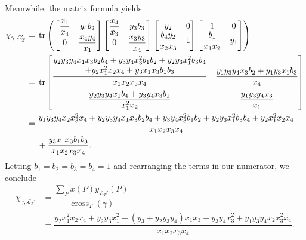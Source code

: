 \documentclass[10pt,a4paper]{amsart}
\numberwithin{equation}{section}
\theoremstyle{definition}
\begin{document}
Meanwhile, the matrix formula yields
\begin{align*}
\chi_{\gamma, \mathcal{L}_T'}={}&\operatorname{tr}\left(
\begin{bmatrix}
 \dfrac{x_1}{x_4} & y_4b_2\\
 0 & \dfrac{x_4y_4}{x_1}
\end{bmatrix}
\begin{bmatrix}
 \dfrac{x_4}{x_3} & y_3b_3\\
 0 & \dfrac{x_3y_3}{x_4}
\end{bmatrix}
\begin{bmatrix}
 y_2 & 0\\
 \dfrac{b_4y_2}{x_2x_3} & 1
\end{bmatrix}
\begin{bmatrix}
 1 & 0\\
 \dfrac{b_1}{x_1x_2} & y_1
\end{bmatrix}\right)\\
={}&\operatorname{tr}
\begin{bmatrix}
 \dfrac{\begin{array}{@{}c@{}}y_2y_3y_4x_1x_3b_2b_4+y_3y_4x_3^2b_1b_2+y_2y_3x_1^2b_3b_4\\
 +y_2x_1^2x_2x_4+y_3x_1x_3b_1b_3\end{array}}{x_1x_2x_3x_4} & \dfrac{y_1y_3y_4x_3b_2+y_1y_3x_1b_3}{x_4}\vspace{2mm}\\
 \dfrac{y_2y_3y_4x_1b_4+y_3y_4x_3b_1}{x_1^2x_2} & \dfrac{y_1y_3y_4x_3}{x_1}
\end{bmatrix}\\
={}&\dfrac{y_1y_3y_4x_2x_3^2x_4+y_2y_3y_4x_1x_3b_2b_4+y_3y_4x_3^2b_1b_2+y_2y_3x_1^2b_3b_4+y_2x_1^2x_2x_4}{x_1x_2x_3x_4}\\
&+\dfrac{y_3x_1x_3b_1b_3}{x_1x_2x_3x_4}.
\end{align*}
Letting $b_1=b_2=b_3=b_4=1$ and rearranging the terms in our numerator, we conclude
\begin{align*}
\chi_{\gamma, \mathcal{L}_T'}&=\dfrac{\sum_P x(P)y_{\mathcal{L}_T'}(P)}{\operatorname{cross}_T(\gamma)}\\
&=\dfrac{y_2x_1^2x_2x_4+y_2y_3x_1^2+(y_3+y_2y_3y_4)x_1x_3+y_3y_4x_3^2+y_1y_3y_4x_2x_3^2x_4}{x_1x_2x_3x_4}.\end{align*}
\end{document}
